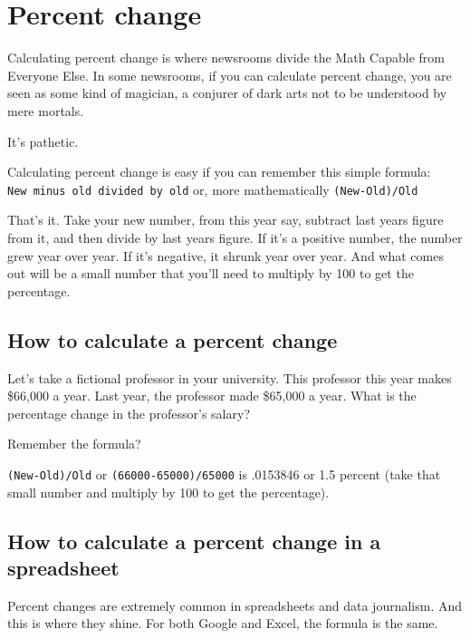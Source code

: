 \documentclass[]{book}
\begin{document}
\hypertarget{percent-change}{%
\chapter{Percent change}\label{percent-change}}

Calculating percent change is where newsrooms divide the Math Capable from Everyone Else. In some newsrooms, if you can calculate percent change, you are seen as some kind of magician, a conjurer of dark arts not to be understood by mere mortals.

It's pathetic.

Calculating percent change is easy if you can remember this simple formula: \texttt{New\ minus\ old\ divided\ by\ old} or, more mathematically \texttt{(New-Old)/Old}

That's it. Take your new number, from this year say, subtract last years figure from it, and then divide by last years figure. If it's a positive number, the number grew year over year. If it's negative, it shrunk year over year. And what comes out will be a small number that you'll need to multiply by 100 to get the percentage.

\hypertarget{how-to-calculate-a-percent-change}{%
\section{How to calculate a percent change}\label{how-to-calculate-a-percent-change}}

Let's take a fictional professor in your university. This professor this year makes \$66,000 a year. Last year, the professor made \$65,000 a year. What is the percentage change in the professor's salary?

Remember the formula?

\texttt{(New-Old)/Old} or \texttt{(66000-65000)/65000} is .0153846 or 1.5 percent (take that small number and multiply by 100 to get the percentage).

\hypertarget{how-to-calculate-a-percent-change-in-a-spreadsheet}{%
\section{How to calculate a percent change in a spreadsheet}\label{how-to-calculate-a-percent-change-in-a-spreadsheet}}

Percent changes are extremely common in spreadsheets and data journalism. And this is where they shine. For both Google and Excel, the formula is the same.
\end{document}

